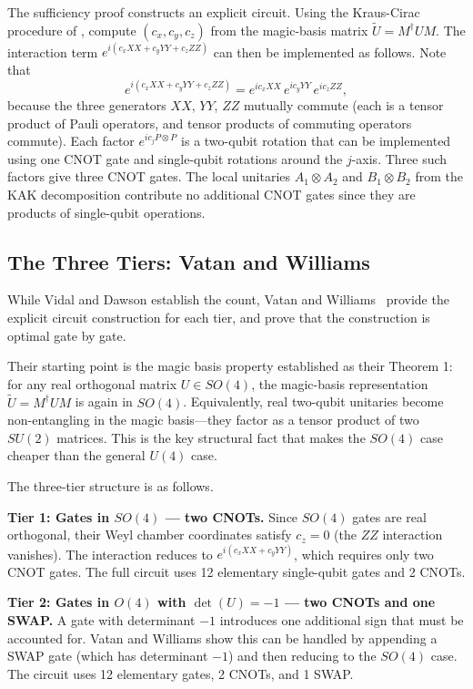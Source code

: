 \documentclass[12pt, a4paper, oneside]{report}
\theoremstyle{plain}
\theoremstyle{definition}
\theoremstyle{remark}
\begin{document}
The sufficiency proof constructs an explicit circuit. Using the Kraus-Cirac procedure of
, compute $(c_x, c_y, c_z)$ from the magic-basis matrix $\tilde{U}
= M^\dagger U M$. The interaction term $e^{i(c_x XX + c_y YY + c_z ZZ)}$ can then be
implemented as follows. Note that
\[
  e^{i(c_x XX + c_y YY + c_z ZZ)}
  = e^{ic_x XX}\,e^{ic_y YY}\,e^{ic_z ZZ},
\]
because the three generators $XX$, $YY$, $ZZ$ mutually commute (each is a tensor product of
Pauli operators, and tensor products of commuting operators commute). Each factor
$e^{ic_j P\otimes P}$ is a two-qubit rotation that can be implemented using one CNOT gate
and single-qubit rotations around the $j$-axis. Three such factors give three CNOT gates.
The local unitaries $A_1 \otimes A_2$ and $B_1 \otimes B_2$ from the KAK decomposition
contribute no additional CNOT gates since they are products of single-qubit operations.

\subsection{The Three Tiers: Vatan and Williams}

While Vidal and Dawson establish the count, Vatan and Williams~\cite{vatan2004} provide the
explicit circuit construction for each tier, and prove that the construction is optimal gate
by gate.

Their starting point is the magic basis property established as their Theorem 1: for any
real orthogonal matrix $U \in SO(4)$, the magic-basis representation $\tilde{U} = M^\dagger
U M$ is again in $SO(4)$. Equivalently, real two-qubit unitaries become non-entangling in
the magic basis---they factor as a tensor product of two $SU(2)$ matrices. This is the key
structural fact that makes the $SO(4)$ case cheaper than the general $U(4)$ case.

The three-tier structure is as follows.

\textbf{Tier 1: Gates in $SO(4)$ --- two CNOTs.}
Since $SO(4)$ gates are real orthogonal, their Weyl chamber coordinates satisfy $c_z = 0$
(the $ZZ$ interaction vanishes). The interaction reduces to $e^{i(c_x XX + c_y YY)}$, which
requires only two CNOT gates. The full circuit uses 12 elementary single-qubit gates and
2 CNOTs.

\textbf{Tier 2: Gates in $O(4)$ with $\det(U) = -1$ --- two CNOTs and one SWAP.}
A gate with determinant $-1$ introduces one additional sign that must be accounted for.
Vatan and Williams show this can be handled by appending a SWAP gate (which has determinant
$-1$) and then reducing to the $SO(4)$ case. The circuit uses 12 elementary gates, 2 CNOTs,
and 1 SWAP.
\end{document}
